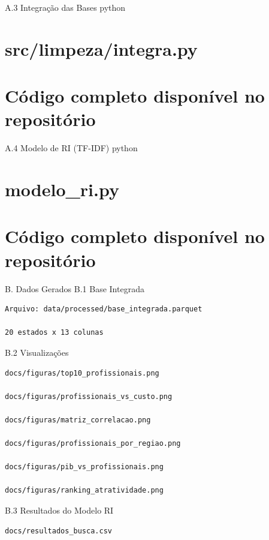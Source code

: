 \documentclass[
  11pt,
  letterpaper,
  DIV=11,
  numbers=noendperiod]{scrartcl}
\begin{document}
A.3 Integração das Bases python

\section{src/limpeza/integra.py}\label{srclimpezaintegra.py-1}

\section{Código completo disponível no
repositório}\label{cuxf3digo-completo-disponuxedvel-no-reposituxf3rio-2}

A.4 Modelo de RI (TF-IDF) python

\section{modelo\_ri.py}\label{modelo_ri.py}

\section{Código completo disponível no
repositório}\label{cuxf3digo-completo-disponuxedvel-no-reposituxf3rio-3}

B. Dados Gerados B.1 Base Integrada

\begin{verbatim}
Arquivo: data/processed/base_integrada.parquet

20 estados x 13 colunas
\end{verbatim}

B.2 Visualizações

\begin{verbatim}
docs/figuras/top10_profissionais.png

docs/figuras/profissionais_vs_custo.png

docs/figuras/matriz_correlacao.png

docs/figuras/profissionais_por_regiao.png

docs/figuras/pib_vs_profissionais.png

docs/figuras/ranking_atratividade.png
\end{verbatim}

B.3 Resultados do Modelo RI

\begin{verbatim}
docs/resultados_busca.csv
\end{verbatim}
\end{document}
